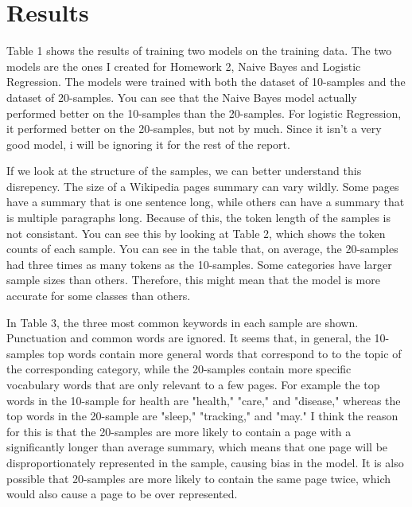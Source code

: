 \documentclass[11pt]{article}
\begin{document}
\section{Results}

Table 1 shows the results of training two models on the training data. The two models are the ones I created for Homework 2, Naive Bayes and Logistic Regression. The models were trained with both the dataset of 10-samples and the dataset of 20-samples. You can see that the Naive Bayes model actually performed better on the 10-samples than the 20-samples. For logistic Regression, it performed better on the 20-samples, but not by much. Since it isn't a very good model, i will be ignoring it for the rest of the report. 

If we look at the structure of the samples, we can better understand this disrepency. The size of a Wikipedia pages summary can vary wildly. Some pages have a summary that is one sentence long, while others can have a summary that is multiple paragraphs long. Because of this, the token length of the samples is not consistant. You can see this by looking at Table 2, which shows the token counts of each sample. You can see in the table that, on average, the 20-samples had three times as many tokens as the 10-samples. Some categories have larger sample sizes than others. Therefore, this might mean that the model is more accurate for some classes than others.

In Table 3, the three most common keywords in each sample are shown. Punctuation and common words are ignored. It seems that, in general, the 10-samples top words contain more general words that correspond to to the topic of the corresponding category, while the 20-samples contain more specific vocabulary words that are only relevant to a few pages. For example the top words in the 10-sample for health are "health," "care," and "disease," whereas the top words in the 20-sample are "sleep," "tracking," and "may." I think the reason for this is that the 20-samples are more likely to contain a page with a significantly longer than average summary, which means that one page will be disproportionately represented in the sample, causing bias in the model. It is also possible that 20-samples are more likely to contain the same page twice, which would also cause a page to be over represented. 
\end{document}
